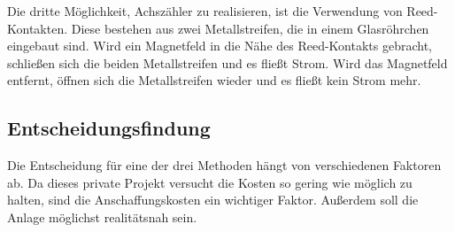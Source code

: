 Die dritte Möglichkeit, Achszähler zu realisieren, ist die Verwendung von Reed-Kontakten. Diese bestehen aus zwei Metallstreifen, die in einem Glasröhrchen eingebaut sind. Wird ein Magnetfeld in die Nähe des Reed-Kontakts gebracht, schließen sich die beiden Metallstreifen und es fließt Strom. Wird das Magnetfeld entfernt, öffnen sich die Metallstreifen wieder und es fließt kein Strom mehr.

\subsection{Entscheidungsfindung}\label{text:Methodik:Achszähler:Entscheidungsfindung}

Die Entscheidung für eine der drei Methoden hängt von verschiedenen Faktoren ab. Da dieses private Projekt versucht die Kosten so gering wie möglich zu halten, sind die Anschaffungskosten ein wichtiger Faktor. Außerdem soll die Anlage möglichst realitätsnah sein.


